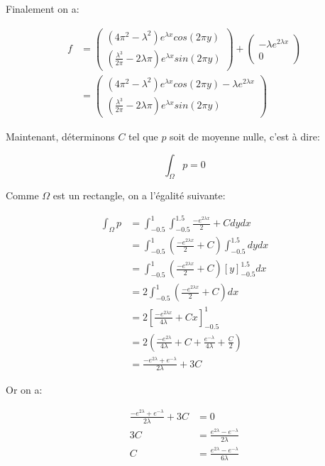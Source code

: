 \documentclass{article}
\begin{document}
Finalement on a:

\begin{align*}
    f &= \begin{pmatrix}
(4 \pi^2-\lambda^2) e^{\lambda x} cos(2 \pi y) \\
(\frac{\lambda^3}{2 \pi}-2 \lambda \pi) e^{\lambda x} sin(2 \pi y)
\end{pmatrix} + \begin{pmatrix}
    -\lambda e^{2 \lambda x} \\
    0
\end{pmatrix} \\
 &= \begin{pmatrix}
(4 \pi^2-\lambda^2) e^{\lambda x} cos(2 \pi y) -\lambda e^{2 \lambda x} \\
(\frac{\lambda^3}{2 \pi}-2 \lambda \pi) e^{\lambda x} sin(2 \pi y)
\end{pmatrix}
\end{align*}

Maintenant, déterminons $C$ tel que $p$ soit de moyenne nulle, c'est à dire:

$$\int_{\Omega} p = 0$$

Comme $\Omega$ est un rectangle, on a l'égalité suivante:

\begin{align*}
    \int_{\Omega} p &= \int^1_{-0.5} \int^{1.5}_{-0.5} \frac{-e^{2 \lambda x}}{2} + C dy dx \\
    &= \int^1_{-0.5} \left(\frac{-e^{2 \lambda x}}{2} + C\right) \int^{1.5}_{-0.5} dy dx \\
    &= \int^1_{-0.5} \left(\frac{-e^{2 \lambda x}}{2} + C\right) \left[ y \right]^{1.5}_{-0.5} dx \\
    &= 2 \int^1_{-0.5} \left(\frac{-e^{2 \lambda x}}{2} + C\right) dx \\
    &= 2 \left[ \frac{- e^{2 \lambda x}}{4 \lambda} + Cx \right]^1_{-0.5} \\
    &= 2 \left( \frac{- e^{2 \lambda}}{4 \lambda} + C + \frac{e^{-\lambda}}{4 \lambda} + \frac{C}{2}\right) \\
    &= \frac{-e^{2 \lambda} + e^{-\lambda}} {2 \lambda} + 3C
\end{align*}

Or on a:

\begin{align*}
    \frac{-e^{2 \lambda} + e^{-\lambda}} {2 \lambda} + 3C &= 0 \\
    3C &= \frac{ e^{2 \lambda} - e^{-\lambda}} {2 \lambda} \\
    C &= \frac{ e^{2 \lambda} - e^{-\lambda}} {6 \lambda}
\end{align*}
\end{document}
